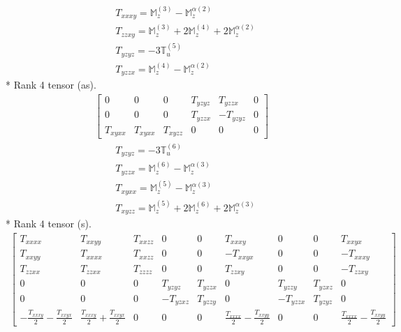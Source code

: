 \documentclass[fleqn,8pt,landscape]{jsarticle}
\begin{document}
\begin{align*}
& T_{xxxy} = \mathbb{M}_{z}^{(3)} - \mathbb{M}_{z}^{\alpha(2)} \\
& T_{zzxy} = \mathbb{M}_{z}^{(3)} + 2 \mathbb{M}_{z}^{(4)} + 2 \mathbb{M}_{z}^{\alpha(2)} \\
& T_{yzyz} = - 3 \mathbb{T}_{u}^{(5)} \\
& T_{yzzx} = \mathbb{M}_{z}^{(4)} - \mathbb{M}_{z}^{\alpha(2)}
\end{align*}
* Rank 4 tensor (as).
\begin{align*}
\begin{bmatrix} 0 & 0 & 0 & T_{yzyz} & T_{yzzx} & 0 \\ 0 & 0 & 0 & T_{yzzx} & - T_{yzyz} & 0 \\ T_{xyxx} & T_{xyxx} & T_{xyzz} & 0 & 0 & 0 \end{bmatrix}
\end{align*}
\begin{align*}
& T_{yzyz} = - 3 \mathbb{T}_{u}^{(6)} \\
& T_{yzzx} = \mathbb{M}_{z}^{(6)} - \mathbb{M}_{z}^{\alpha(3)} \\
& T_{xyxx} = \mathbb{M}_{z}^{(5)} - \mathbb{M}_{z}^{\alpha(3)} \\
& T_{xyzz} = \mathbb{M}_{z}^{(5)} + 2 \mathbb{M}_{z}^{(6)} + 2 \mathbb{M}_{z}^{\alpha(3)}
\end{align*}
* Rank 4 tensor (s).
\begin{align*}
\begin{bmatrix} T_{xxxx} & T_{xxyy} & T_{xxzz} & 0 & 0 & T_{xxxy} & 0 & 0 & T_{xxyx} \\ T_{xxyy} & T_{xxxx} & T_{xxzz} & 0 & 0 & - T_{xxyx} & 0 & 0 & - T_{xxxy} \\ T_{zzxx} & T_{zzxx} & T_{zzzz} & 0 & 0 & T_{zzxy} & 0 & 0 & - T_{zzxy} \\ 0 & 0 & 0 & T_{yzyz} & T_{yzzx} & 0 & T_{yzzy} & T_{yzxz} & 0 \\ 0 & 0 & 0 & - T_{yzxz} & T_{yzzy} & 0 & - T_{yzzx} & T_{yzyz} & 0 \\ - \frac{T_{xxxy}}{2} - \frac{T_{xxyx}}{2} & \frac{T_{xxxy}}{2} + \frac{T_{xxyx}}{2} & 0 & 0 & 0 & \frac{T_{xxxx}}{2} - \frac{T_{xxyy}}{2} & 0 & 0 & \frac{T_{xxxx}}{2} - \frac{T_{xxyy}}{2} \end{bmatrix}
\end{align*}
\end{document}
